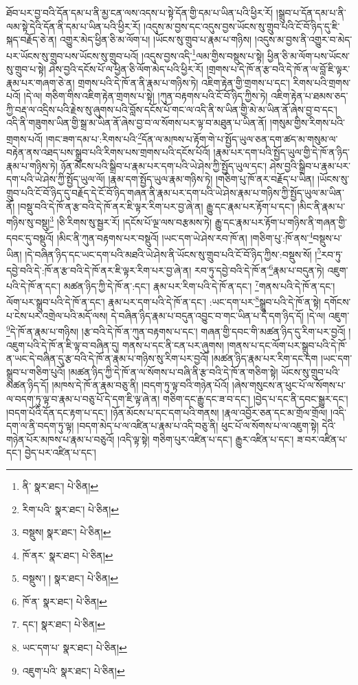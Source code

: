 ཐོབ་པར་བྱ་བའི་དོན་དམ་པ་ནི་མྱ་ངན་ལས་འདས་པ་སྟེ་དོན་གྱི་དམ་པ་ཡིན་པའི་ཕྱིར་རོ། །སྒྲུབ་པ་དོན་དམ་པ་ནི་ལམ་སྟེ་དེའི་དོན་ནི་དམ་པ་ཡིན་པའི་ཕྱིར་རོ། །འདུས་མ་བྱས་དང་འདུས་བྱས་ཡོངས་སུ་གྲུབ་པའི་ངོ་བོ་ཉིད་དུ་ཇི་སྐད་བརྗོད་ཅེ་ན། འགྱུར་མེད་ཕྱིན་ཅི་མ་ལོག་པ། །ཡོངས་སུ་གྲུབ་པ་རྣམ་པ་གཉིས། །འདུས་མ་བྱས་ནི་འགྱུར་བ་མེད་པར་ཡོངས་སུ་གྲུབ་པས་ཡོངས་སུ་གྲུབ་པའོ། །འདུས་བྱས་འདི་\footnote{ནི་  སྣར་ཐང་།  པེ་ཅིན། }ལམ་གྱིས་བསྡུས་པ་སྟེ། ཕྱིན་ཅི་མ་ལོག་པས་ཡོངས་སུ་གྲུབ་པ་སྟེ། ཤེས་བྱའི་དངོས་པོ་ལ་ཕྱིན་ཅི་ལོག་མེད་པའི་ཕྱིར་རོ། །གྲགས་པ་དེ་ཁོ་ན་རྩ་བའི་དེ་ཁོ་ན་ལ་བློ་ཇི་ལྟར་རྣམ་པར་གཞག་ཅེ་ན། གྲགས་པའི་དེ་ཁོ་ན་ནི་རྣམ་པ་གཉིས་ཏེ། འཇིག་རྟེན་གྱི་གྲགས་པ་དང་། རིགས་པའི་གྲགས་པའོ། །དེ་ལ། གཅིག་གིས་འཇིག་རྟེན་གྲགས་པ་སྟེ། །ཀུན་བརྟགས་པའི་ངོ་བོ་ཉིད་ཀྱིས་ཏེ། འཇིག་རྟེན་པ་ཐམས་ཅད་ཀྱི་བརྡ་ལ་འདྲིས་པའི་རྗེས་སུ་ཞུགས་པའི་བློས་དངོས་པོ་གང་ལ་འདི་ནི་ས་ཡིན་གྱི་མེ་མ་ཡིན་ནོ་ཞེས་བྱ་བ་དང་། འདི་ནི་གཟུགས་ཡིན་གྱི་སྒྲ་མ་ཡིན་ནོ་ཞེས་བྱ་བ་ལ་སོགས་པར་ལྟ་བ་མཐུན་པ་ཡིན་ནོ། །གསུམ་གྱིས་རིགས་པའི་གྲགས་པའོ། །གང་ཟག་དམ་པ་:རིགས་པའི་\footnote{རིག་པའི་  སྣར་ཐང་།  པེ་ཅིན། }དོན་ལ་མཁས་པ་རྟོག་གེ་པ་སྤྱོད་ཡུལ་ཅན་དག་ཚད་མ་གསུམ་ལ་བརྟེན་ནས་འཐད་པས་སྒྲུབ་པའི་རིགས་པས་གྲགས་པའི་དངོས་པོའོ། །རྣམ་པར་དག་པའི་སྤྱོད་ཡུལ་གྱི་དེ་ཁོ་ན་ཉིད་རྣམ་པ་གཉིས་ཏེ། ཉོན་མོངས་པའི་སྒྲིབ་པ་རྣམ་པར་དག་པའི་ཡེ་ཤེས་ཀྱི་སྤྱོད་ཡུལ་དང་། ཤེས་བྱའི་སྒྲིབ་པ་རྣམ་པར་དག་པའི་ཡེ་ཤེས་ཀྱི་སྤྱོད་ཡུལ་ལོ། །རྣམ་དག་སྤྱོད་ཡུལ་རྣམ་གཉིས་ཏེ། །གཅིག་པུ་ཁོ་ནར་བརྗོད་པ་ཡིན། །ཡོངས་སུ་གྲུབ་པའི་ངོ་བོ་ཉིད་དུ་བརྗོད་དེ་ངོ་བོ་ཉིད་གཞན་ནི་རྣམ་པར་དག་པའི་ཡེ་ཤེས་རྣམ་པ་གཉིས་ཀྱི་སྤྱོད་ཡུལ་མ་ཡིན་ནོ། །བསྡུ་བའི་དེ་ཁོ་ན་རྩ་བའི་དེ་ཁོ་ནར་ཇི་ལྟར་རིག་པར་བྱ་ཞེ་ན། རྒྱུ་དང་རྣམ་པར་རྟོག་པ་དང་། །མིང་ནི་རྣམ་པ་གཉིས་སུ་བསྡུ།\footnote{བསྡུས།  སྣར་ཐང་།  པེ་ཅིན། } །ཅི་རིགས་སུ་སྦྱར་རོ། །དངོས་པོ་ལྔ་ལས་བརྩམས་ཏེ། རྒྱུ་དང་རྣམ་པར་རྟོག་པ་གཉིས་ནི་གཞན་གྱི་དབང་དུ་བསྡུའོ། །མིང་ནི་ཀུན་བརྟགས་པར་བསྡུའོ། །ཡང་དག་ཡེ་ཤེས་རབ་ཁོ་ན། །གཅིག་པུ་:ཁོ་ནས་\footnote{ཁོ་ནར་  སྣར་ཐང་།  པེ་ཅིན། }བསྡུས་པ་ཡིན། །དེ་བཞིན་ཉིད་དང་ཡང་དག་པའི་མཐའི་ཡེ་ཤེས་ནི་ཡོངས་སུ་གྲུབ་པའི་ངོ་བོ་ཉིད་ཀྱིས་:བསྡུས་སོ། །\footnote{བསྡུས་། །   སྣར་ཐང་།  པེ་ཅིན། }རབ་ཏུ་དབྱེ་བའི་དེ་:ཁོ་ན་རྩ་བའི་དེ་ཁོ་ནར་ཇི་ལྟར་རིག་པར་བྱ་ཞེ་ན། རབ་ཏུ་དབྱེ་བའི་དེ་ཁོ་ན་\footnote{ཁོ་ན་  སྣར་ཐང་།  པེ་ཅིན། }རྣམ་པ་བདུན་ཏེ། འཇུག་པའི་དེ་ཁོ་ན་དང་། མཚན་ཉིད་ཀྱི་དེ་ཁོ་ན་:དང་། རྣམ་པར་རིག་པའི་དེ་ཁོ་ན་དང་། \footnote{དང་།    སྣར་ཐང་།  པེ་ཅིན། }གནས་པའི་དེ་ཁོ་ན་དང་། ལོག་པར་སྒྲུབ་པའི་དེ་ཁོ་ན་དང་། རྣམ་པར་དག་པའི་དེ་ཁོ་ན་དང་། :ཡང་དག་པར་\footnote{ཡང་དག་པ་  སྣར་ཐང་།  པེ་ཅིན། }སྒྲུབ་པའི་དེ་ཁོ་ན་སྟེ། དགོངས་པ་ངེས་པར་འགྲེལ་པའི་མདོ་ལས། དེ་བཞིན་ཉིད་རྣམ་པ་བདུན་འབྱུང་བ་གང་ཡིན་པ་དེ་དག་ཉིད་དོ། །དེ་ལ། འཇུག་\footnote{འཇུག་པའི་  སྣར་ཐང་།  པེ་ཅིན། }དེ་ཁོ་ན་རྣམ་པ་གཉིས། །རྩ་བའི་དེ་ཁོ་ན་ཀུན་བརྟགས་པ་དང་། གཞན་གྱི་དབང་གི་མཚན་ཉིད་དུ་རིག་པར་བྱའོ། །འཇུག་པའི་དེ་ཁོ་ན་ཇི་ལྟ་བ་བཞིན་དུ། གནས་པ་དང་ནི་ངན་པར་ཞུགས། །གནས་པ་དང་ལོག་པར་སྒྲུབ་པའི་དེ་ཁོ་ན་ཡང་དེ་བཞིན་དུ་རྩ་བའི་དེ་ཁོ་ན་རྣམ་པ་གཉིས་སུ་རིག་པར་བྱའོ། །མཚན་ཉིད་རྣམ་པར་རིག་དང་དག །ཡང་དག་སྒྲུབ་པ་གཅིག་པུའོ། །མཚན་ཉིད་ཀྱི་དེ་ཁོ་ན་ལ་སོགས་པ་བཞི་ནི་རྩ་བའི་དེ་ཁོ་ན་གཅིག་སྟེ། ཡོངས་སུ་གྲུབ་པའི་མཚན་ཉིད་དོ། །མཁས་དེ་ཁོ་ན་རྣམ་བཅུ་ནི། །བདག་ཏུ་ལྟ་བའི་གཉེན་པོའོ། །ཞེས་གསུངས་ན་ཕུང་པོ་ལ་སོགས་པ་ལ་བདག་ཏུ་ལྟ་བ་རྣམ་པ་བཅུ་པོ་དེ་དག་ཇི་ལྟ་ཞེ་ན། གཅིག་དང་རྒྱུ་དང་ཟ་བ་དང་། །བྱེད་པ་དང་ནི་དབང་སྒྱུར་དང་། །བདག་པོའི་དོན་དང་རྟག་པ་དང་། །ཉོན་མོངས་པ་དང་དག་པའི་གནས། །རྣལ་འབྱོར་ཅན་དང་མ་གྲོལ་གྲོལ། །འདི་དག་ལ་ནི་བདག་ཏུ་ལྟ། །བདག་མེད་པ་ལ་འཛིན་པ་རྣམ་པ་འདི་བཅུ་ནི། ཕུང་པོ་ལ་སོགས་པ་ལ་འཇུག་སྟེ། དེའི་གཉེན་པོར་མཁས་པ་རྣམ་པ་བཅུའོ། །འདི་ལྟ་སྟེ། གཅིག་པུར་འཛིན་པ་དང་། རྒྱུར་འཛིན་པ་དང་། ཟ་བར་འཛིན་པ་དང་། བྱེད་པར་འཛིན་པ་དང་། 